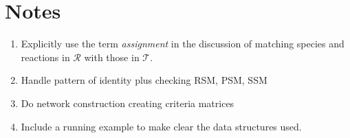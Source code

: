 \documentclass{article}
\newcommand{\net}[1]{$\mathcal{#1}$} %
\begin{document}
\section{Notes}
\begin{enumerate}
    \item Explicitly use the term {\em assignment} in the discussion of matching species and reactions in \net{R} with those in \net{T}.
    \item Handle pattern of identity plus checking RSM, PSM, SSM
    \item Do network construction creating criteria matrices
    \item Include a running example to make clear the data structures used.
\end{enumerate}



%
%
\end{document}
